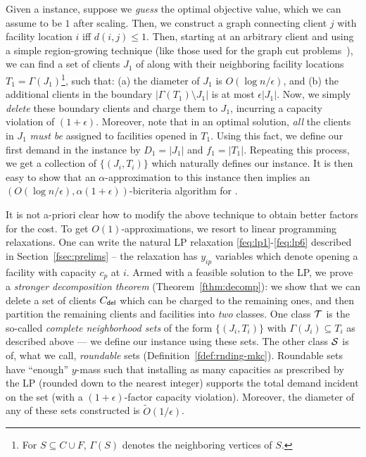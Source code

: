 \medskip {}
Given a \mckc instance, suppose we \emph{guess} the optimal objective value, which we can assume to be $1$ after scaling. Then, we construct a graph connecting client $j$ with facility location $i$ iff $d(i,j) \leq 1$.
Then, starting at an arbitrary client and using a simple region-growing technique (like those used for the graph cut problems~\cite{LeightonR99,GargVY96}), we can find a set of clients $J_1$ of along with their neighboring facility locations $T_1 = \Gamma(J_1)$\footnote{For $S \subseteq C \cup F$, $\Gamma(S)$ denotes the neighboring vertices  of $S$.}, such that: (a) the diameter of $J_1$ is $O(\log n/\epsilon)$, and (b) the additional clients in the boundary $|\Gamma(T_1) \setminus J_1|$ is at most $\epsilon |J_1|$. Now, we simply \emph{delete} these boundary clients and charge them to $J_1$, incurring a capacity violation of $(1+\epsilon)$. Moreover, note that in an optimal solution, \emph{all} the clients in $J_1$ \emph{must be} assigned to facilities opened in $T_1$. Using this fact, we define our first demand in the \cckp instance by $D_1 = |J_1|$ and $f_1 = |T_1|$. Repeating this process, we get a collection of $\{(J_i,T_i)\}$ which naturally defines our \cckp instance. It is then easy to show that an $\alpha$-approximation to this instance then implies an $(O(\log n/\epsilon),  \alpha(1+\epsilon))$-bicriteria algorithm for \mckc.

\medskip {}  It is not a-priori clear how to modify the above technique to obtain better factors for the cost. To get $O(1)$-approximations, we resort to linear programming relaxations. One can write the natural LP relaxation \eqref{feq:lp1}-\eqref{feq:lp6} described in Section~\ref{fsec:prelims} -- the relaxation has $y_{ip}$ variables which denote opening a
facility with capacity $c_p$ at $i$.
Armed with a feasible solution to the LP, we prove a \emph{stronger decomposition theorem} (Theorem~\ref{fthm:decomp}): we show that we can delete a set of clients $C_{\mathsf{del}}$ which can be charged to the remaining ones, and then partition the remaining clients and facilities into {\em two} classes.
One class ${\cal T}$  is the so-called \emph{complete neighborhood sets} of the form $\{(J_i, T_i)\}$ with $\Gamma(J_i) \subseteq T_i$ as described above --- we define our \cckp instance using these sets. The other class ${\cal S}$  is of, what we call, {\em roundable} sets (Definition~\ref{fdef:rnding-mkc}). Roundable sets have ``enough'' $y$-mass such that installing as many  capacities as prescribed by the LP (rounded down to the nearest integer) supports the total demand incident on the set (with a $(1+\epsilon)$-factor capacity violation). Moreover, the diameter of any of these sets constructed is $\tilde{O}(1/\epsilon)$.

